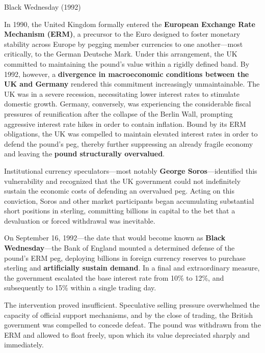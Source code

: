 \documentclass[10pt]{article}
\begin{document}
    \begin{core}[label=core:black_wednesday]{Black Wednesday (1992)}

      In 1990, the United Kingdom formally entered the \textbf{European Exchange Rate Mechanism (ERM)}, a precursor to the Euro designed to foster monetary stability across Europe by pegging member currencies to one another---most critically, to the German Deutsche Mark. Under this arrangement, the UK committed to maintaining the pound's value within a rigidly defined band. By 1992, however, a \textbf{divergence in macroeconomic conditions between the UK and Germany} rendered this commitment increasingly unmaintainable. The UK was in a severe recession, necessitating lower interest rates to stimulate domestic growth. Germany, conversely, was experiencing the considerable fiscal pressures of reunification after the collapse of the Berlin Wall, prompting aggressive interest rate hikes in order to contain inflation. Bound by its ERM obligations, the UK was compelled to maintain elevated interest rates in order to defend the pound's peg, thereby further suppressing an already fragile economy and leaving the \textbf{pound structurally overvalued}.

      Institutional currency speculators---most notably \textbf{George Soros}---identified this vulnerability and recognized that the UK government could not indefinitely sustain the economic costs of defending an overvalued peg. Acting on this conviction, Soros and other market participants began accumulating substantial short positions in sterling, committing billions in capital to the bet that a devaluation or forced withdrawal was inevitable.

      On September 16, 1992---the date that would become known as \textbf{Black Wednesday}---the Bank of England mounted a determined defense of the pound's ERM peg, deploying billions in foreign currency reserves to purchase sterling and \textbf{artificially sustain demand}. In a final and extraordinary measure, the government escalated the base interest rate from 10\% to 12\%, and subsequently to 15\% within a single trading day.


      The intervention proved insufficient. Speculative selling pressure overwhelmed the capacity of official support mechanisms, and by the close of trading, the British government was compelled to concede defeat. The pound was withdrawn from the ERM and allowed to float freely, upon which its value depreciated sharply and immediately.

    \end{core}
\end{document}
